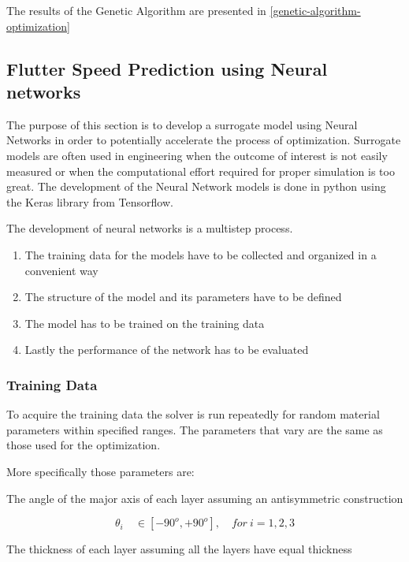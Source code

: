 The results of the Genetic Algorithm are presented in \autoref{genetic-algorithm-optimization}


\subsection{Flutter Speed Prediction using Neural networks}
\label{flutter-speed-prediction-using-neural-networks}

The purpose of this section is to develop a surrogate model using Neural
Networks in order to potentially accelerate the process of optimization.
Surrogate models are often used in engineering when the outcome of
interest is not easily measured or when the computational effort
required for proper simulation is too great. The development of the
Neural Network models is done in python using the Keras library from
Tensorflow.

The development of neural networks is a multistep process.

\begin{enumerate}
\def\labelenumi{\arabic{enumi}.}
\item
  The training data for the models have to be collected and organized in
  a convenient way
\item
  The structure of the model and its parameters have to be defined
\item
  The model has to be trained on the training data
\item
  Lastly the performance of the network has to be evaluated
\end{enumerate}


\subsubsection{Training Data}

To acquire the training data the solver is run repeatedly for random
material parameters within specified ranges. The parameters that vary
are the same as those used for the optimization.

More specifically those parameters are:

The angle of the major axis of each layer assuming an antisymmetric
construction

\begin{equation}
\theta_{i} \quad \in [ - 90^{o}, + 90^{o}], \quad for\ i = 1,2,3
\end{equation}


The thickness of each layer assuming all the layers have equal thickness

